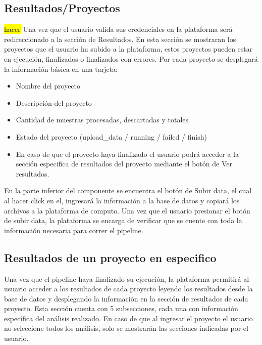\begin{itemize}
\subsection{Resultados/Proyectos} \label{projects}
\hl{hacer}
Una vez que el usuario valida sus credenciales en la plataforma será redireccionado a la sección de Resultados. En esta sección se mostraran los proyectos que el usuario ha subido a la plataforma, estos proyectos pueden estar en ejecución, finalizados o finalizados con errores. 
Por cada proyecto se desplegará la información básica en una tarjeta:
\begin{itemize}
    \item Nombre del proyecto
    \item Descripción del proyecto
    \item Cantidad de muestras procesadas, descartadas y totales
    \item Estado del proyecto (upload\_data / running / failed / finish)
    \item En caso de que el proyecto haya finalizado el usuario podrá acceder a la sección especifica de resultados del proyecto mediante el botón de Ver resultados.
\end{itemize}



En la parte inferior del componente se encuentra el botón de Subir data, el cual al hacer click en el, ingresará la información a la base de datos y copiará los archivos a la plataforma de computo. Una vez que el usuario presionar el botón de subir data, la plataforma se encarga de verificar que se cuente con toda la información necesaria para correr el pipeline.
\subsection{Resultados de un proyecto en especifico}
Una vez que el pipeline haya finalizado su ejecución, la plataforma permitirá al usuario acceder a los resultados de cada proyecto leyendo los resultados desde la base de datos y desplegando la información en la sección de resultados de cada proyecto.
Esta sección cuenta con 5 subsecciones, cada una con información específica del análisis realizado. 
En caso de que al ingresar el proyecto el usuario no seleccione todos los análisis, solo se mostrarán las secciones indicadas por el usuario.


\end{itemize}
